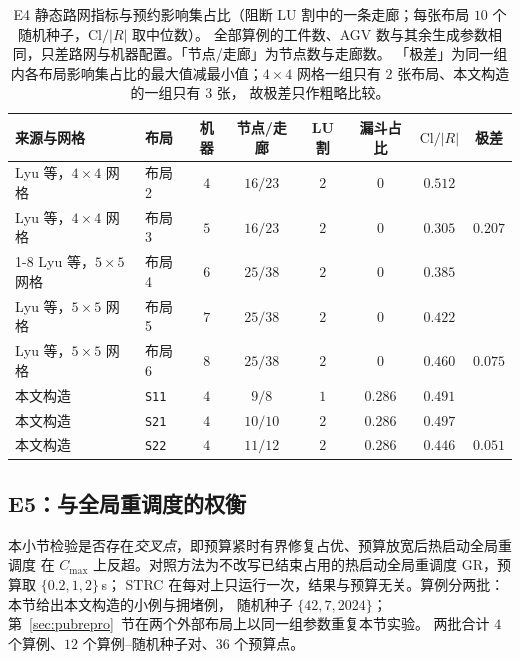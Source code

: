 \documentclass[manuscript,screen,review]{acmart}
\providecommand{\STRC}{\textsc{STRC}}
\newcommand{\NSeeds}{10}
\newcommand{\EfiveInst}{4}          %
\newcommand{\EfiveCells}{12}        %
\newcommand{\EfivePts}{36}          %
\newcommand{\PubCloSpread}{0.207}
\newcommand{\PubCloSpreadBig}{0.075}
\newcommand{\SelfCloSpread}{0.051}
\begin{document}
\begin{table}[t]
\centering
\caption{E4 静态路网指标与预约影响集占比（阻断 LU 割中的一条走廊；每张布局 \(\NSeeds\) 个随机种子，\(\mathrm{Cl}/|R|\) 取中位数）。
全部算例的工件数、AGV 数与其余生成参数相同，只差路网与机器配置。「节点/走廊」为节点数与走廊数。
「极差」为同一组内各布局影响集占比的最大值减最小值；\(4\times 4\) 网格一组只有 \(2\) 张布局、本文构造的一组只有 \(3\) 张，
故极差只作粗略比较。}
\label{tab:e4pub}
\small
\begin{tabular}{@{}llcccccc@{}}
\toprule
来源与网格 & 布局 & 机器 & 节点/走廊 & LU 割 & 漏斗占比 & \(\mathrm{Cl}/|R|\)
 & 极差 \\
\midrule
Lyu 等，\(4\times 4\) 网格 & 布局 2 & \(4\) & \(16/23\) & \(2\) & \(0\) & \(0.512\) & \\
Lyu 等，\(4\times 4\) 网格 & 布局 3 & \(5\) & \(16/23\) & \(2\) & \(0\) & \(0.305\)
  & \(\PubCloSpread\) \\
\cmidrule{1-8}
Lyu 等，\(5\times 5\) 网格 & 布局 4 & \(6\) & \(25/38\) & \(2\) & \(0\) & \(0.385\) & \\
Lyu 等，\(5\times 5\) 网格 & 布局 5 & \(7\) & \(25/38\) & \(2\) & \(0\) & \(0.422\) & \\
Lyu 等，\(5\times 5\) 网格 & 布局 6 & \(8\) & \(25/38\) & \(2\) & \(0\) & \(0.460\)
  & \(\PubCloSpreadBig\) \\
\midrule
本文构造 & \texttt{S11} & \(4\) & \(9/8\) & \(1\) & \(0.286\) & \(0.491\) & \\
本文构造 & \texttt{S21} & \(4\) & \(10/10\) & \(2\) & \(0.286\) & \(0.497\) & \\
本文构造 & \texttt{S22} & \(4\) & \(11/12\) & \(2\) & \(0.286\) & \(0.446\)
  & \(\SelfCloSpread\) \\
\bottomrule
\end{tabular}
\end{table}

\subsection{E5：与全局重调度的权衡}
\label{sec:e5}

本小节检验是否存在\emph{交叉点}，即预算紧时有界修复占优、预算放宽后热启动全局重调度
在 \(C_{\max}\) 上反超。对照方法为不改写已结束占用的热启动全局重调度 GR，预算取 \(\{0.2,1,2\}\)\,s；
\STRC{} 在每对上只运行一次，结果与预算无关。算例分两批：本节给出本文构造的小例与拥堵例，
随机种子 \(\{42,7,2024\}\)；第~\ref{sec:pubrepro}~节在两个外部布局上以同一组参数重复本节实验。
两批合计 \(\EfiveInst\) 个算例、\(\EfiveCells\) 个算例--随机种子对、\(\EfivePts\) 个预算点。
\end{document}
